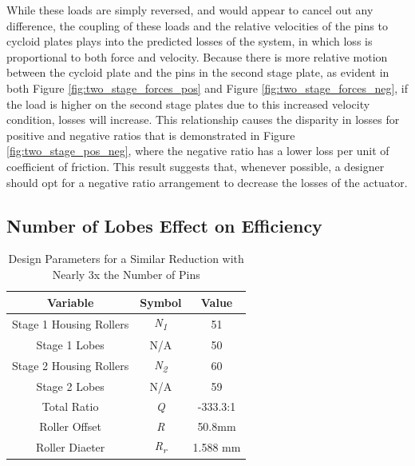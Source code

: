 While these loads are simply reversed, and would appear to cancel out any difference, the coupling of these loads and the relative velocities of the pins to cycloid plates plays into the predicted losses of the system, in which loss is proportional to both force and velocity. Because there is more relative motion between the cycloid plate and the pins in the second stage plate, as evident in both Figure \ref{fig:two_stage_forces_pos} and Figure \ref{fig:two_stage_forces_neg}, if the load is higher on the second stage plates due to this increased velocity condition, losses will increase. This relationship causes the disparity in losses for positive and negative ratios that is demonstrated in Figure \ref{fig:two_stage_pos_neg}, where the negative ratio has a lower loss per  unit of coefficient of friction. This result suggests that, whenever possible, a designer should opt for a negative ratio arrangement to decrease the losses of the actuator. 



\subsection{Number of Lobes Effect on Efficiency}\label{ch:dual:discussion:num_lobes}

\begin{table}[t]
  \vskip0.2cm
  \caption{Design Parameters for a Similar Reduction with Nearly 3x the Number of Pins}
  \label{table:two_stage_high_pins}
  \begin{center}
    \vskip-0.2cm
	\begin{tabular}{|c|c|c|}
		\hline
		Variable & Symbol & Value\\
		\hline
		Stage 1 Housing Rollers & \textit{N\textsubscript{1}} & 51\\
		\hline
		Stage 1 Lobes & N/A & 50\\
		\hline
		Stage 2 Housing Rollers & \textit{N\textsubscript{2}} & 60\\
		\hline
		Stage 2 Lobes & N/A & 59\\
		\hline
		Total Ratio & \textit{Q} & -333.3:1 \\
		\hline
		Roller Offset & \textit{R} & 50.8mm \\
		\hline
		Roller Diaeter & \textit{R\textsubscript{r}} & 1.588 mm\\
		\hline
	\end{tabular}
  \end{center}
\end{table}


